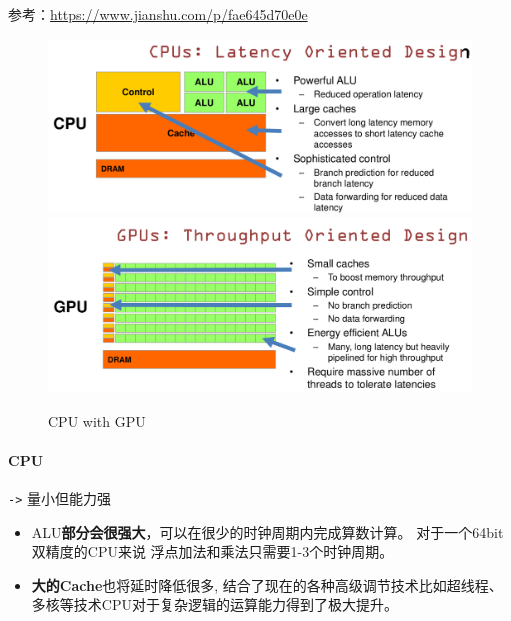 \documentclass[UTF8,a4paper,12pt]{ctexbook}
\begin{document}
			参考：\url{https://www.jianshu.com/p/fae645d70e0e}
		
			\begin{figure}[H]
				\centering
				\includegraphics[scale=0.4]{CpuWithGpu}
				\includegraphics[scale=0.4]{CpuWithGpu2}
				\caption{CPU with GPU}
			\end{figure}
		
			\paragraph{CPU}\verb|->|
					量小但能力强
					\begin{itemize}
						\item 	ALU\textbf{部分会很强大}，可以在很少的时钟周期内完成算数计算。 对于一个64bit双精度的CPU来说 浮点加法和乘法只需要1-3个时钟周期。 							
						\item 	\textbf{大的Cache}也将延时降低很多, 结合了现在的各种高级调节技术比如超线程、多核等技术CPU对于复杂逻辑的运算能力得到了极大提升。
					\end{itemize}
			
\end{document}
